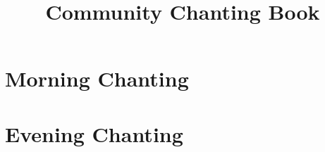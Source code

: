 \documentclass[final]{chantingbook}
\title{Community Chanting Book}
\begin{document}
%
%

\mainmatter


\part{Morning Chanting}



\part{Evening Chanting}



%
%
%

%
%
%
\end{document}
